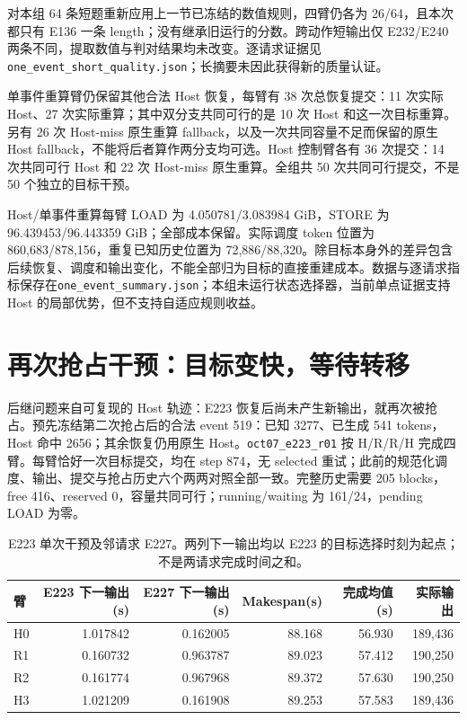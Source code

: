 \documentclass[UTF8,fontset=fandol,a4paper,10pt]{ctexart}
\newcommand{\code}[1]{\nolinkurl{#1}}
\begin{document}
对本组 64 条短题重新应用上一节已冻结的数值规则，四臂仍各为 26/64，且本次都只有 E136 一条 length；没有继承旧运行的分数。跨动作短输出仅 E232/E240 两条不同，提取数值与判对结果均未改变。逐请求证据见\code{one_event_short_quality.json}；长摘要未因此获得新的质量认证。

单事件重算臂仍保留其他合法 Host 恢复，每臂有 38 次总恢复提交：11 次实际 Host、27 次实际重算；其中双分支共同可行的是 10 次 Host 和这一次目标重算。另有 26 次 Host-miss 原生重算 fallback，以及一次共同容量不足而保留的原生 Host fallback，不能将后者算作两分支均可选。Host 控制臂各有 36 次提交：14 次共同可行 Host 和 22 次 Host-miss 原生重算。全组共 50 次共同可行提交，不是 50 个独立的目标干预。

Host/单事件重算每臂 LOAD 为 4.050781/3.083984 GiB，STORE 为 96.439453/96.443359 GiB；全部成本保留。实际调度 token 位置为 860,683/878,156，重复已知历史位置为 72,886/88,320。除目标本身外的差异包含后续恢复、调度和输出变化，不能全部归为目标的直接重建成本。数据与逐请求指标保存在\code{one_event_summary.json}；本组未运行状态选择器，当前单点证据支持 Host 的局部优势，但不支持自适应规则收益。

\section{再次抢占干预：目标变快，等待转移}
\label{sec:e223}
后继问题来自可复现的 Host 轨迹：E223 恢复后尚未产生新输出，就再次被抢占。预先冻结第二次抢占后的合法 event 519：已知 3277、已生成 541 tokens，Host 命中 2656；其余恢复仍用原生 Host。\code{oct07_e223_r01} 按 H/R/R/H 完成四臂。每臂恰好一次目标提交，均在 step 874，无 selected 重试；此前的规范化调度、输出、提交与抢占历史六个两两对照全部一致。完整历史需要 205 blocks，free 416、reserved 0，容量共同可行；running/waiting 为 161/24，pending LOAD 为零。

\begin{table}[htbp]
\centering\small
\caption{E223 单次干预及邻请求 E227。两列下一输出均以 E223 的目标选择时刻为起点；不是两请求完成时间之和。}
\label{tab:e223}
\begin{tabular}{lrrrrr}
\toprule
臂 & E223 下一输出(s) & E227 下一输出(s) & Makespan(s) & 完成均值(s) & 实际输出 \\
\midrule
H0 & 1.017842 & 0.162005 & 88.168 & 56.930 & 189,436 \\
R1 & 0.160732 & 0.963787 & 89.023 & 57.412 & 190,250 \\
R2 & 0.161774 & 0.967968 & 89.372 & 57.630 & 190,250 \\
H3 & 1.021209 & 0.161908 & 89.253 & 57.583 & 189,436 \\
\bottomrule
\end{tabular}
\end{table}
\end{document}
